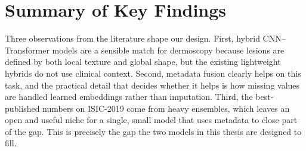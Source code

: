\section{Summary of Key Findings}

Three observations from the literature shape our design. First, hybrid
CNN--Transformer models are a sensible match for dermoscopy because lesions are
defined by both local texture and global shape, but the existing lightweight
hybrids do not use clinical context. Second, metadata fusion clearly helps on
this task, and the practical detail that decides whether it helps is how
missing values are handled learned embeddings rather than imputation. Third,
the best-published numbers on ISIC-2019 come from heavy ensembles, which leaves
an open and useful niche for a single, small model that uses metadata to close
part of the gap. This is precisely the gap the two models in this thesis are
designed to fill.
